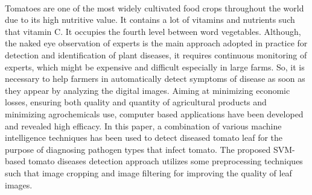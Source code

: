 \documentclass[12pt,a4paper, oneside]{article}
\begin{document}
\\
\setlength{\parindent}{20pt}    Tomatoes are one of the most widely cultivated food crops throughout the world due to its high nutritive value. It contains a lot of vitamins and nutrients such that vitamin C. It occupies the fourth level between word vegetables. Although, the naked eye observation of experts is the main approach adopted in practice for detection and identification of plant diseases, it requires continuous monitoring of experts, which might be expensive and difficult especially in large farms. So, it is necessary to help farmers in automatically detect symptoms of disease as soon as they appear by analyzing the digital images. Aiming at minimizing economic losses, ensuring both quality and quantity of agricultural products and minimizing agrochemicals use, computer based applications have been developed and revealed high efficacy. In this paper, a combination of various machine intelligence techniques has been used to detect diseased tomato leaf for the purpose of diagnosing pathogen types that infect tomato. The proposed SVM-based tomato diseases detection approach utilizes some preprocessing techniques such that image cropping and image filtering for improving the quality of leaf images.
\end{document}

